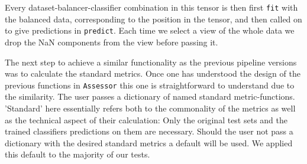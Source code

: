 Every dataset-balancer-classifier combination in this tensor is then first \texttt{fit} with the balanced data, corresponding to the position in the tensor, 
and then called on to give predictions in \texttt{predict}. Each time we select a view of the whole data we drop the NaN components from the view before passing it.

The next step to achieve a similar functionality as the previous pipeline versions was to calculate the standard metrics. 
Once one has understood the design of the previous functions in \texttt{Assessor} this one is straightforward to understand due to the similarity.
The user passes a dictionary of named standard metric-functions. 
'Standard' here essentially refers both to the commonality of the metrics as well as the technical aspect of their calculation:
Only the original test sets and the trained classifiers predictions on them are necessary.
Should the user not pass a dictionary with the desired standard metrics a default will be used. We applied this default to the majority of our tests.

